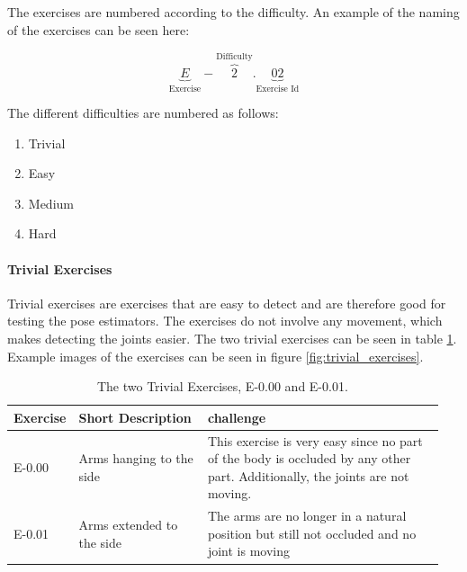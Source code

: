 The exercises are numbered according to the difficulty. An example of the naming of the exercises can be seen here:

\[
    \underbrace{E}_\text{Exercise}-\overbrace{2}^\text{Difficulty}.\underbrace{02}_\text{Exercise Id}
\]

The different difficulties are numbered as follows:

\begin{enumerate}
    \addtocounter{enumi}{-1}
    \item Trivial
    \item Easy
    \item Medium
    \item Hard
\end{enumerate}

\paragraph{Trivial Exercises}

Trivial exercises are exercises that are easy to detect and are therefore good for testing the pose estimators. The exercises do not involve any movement, which makes detecting the joints easier. The two trivial exercises can be seen in table \ref{tab:trivial_exercises}. Example images of the exercises can be seen in figure \ref{fig:trivial_exercises}.

\begin{table}[ht]
  \caption[Trivial Exercises]{The two Trivial Exercises, E-0.00 and E-0.01.}
  \label{tab:trivial_exercises}
  \begin{tabular}{p{0.1\linewidth}p{0.3\linewidth}p{0.55\linewidth}}
  \hline
  Exercise & Short Description         & challenge   \\ \hline
  E-0.00   & Arms hanging to the side  & This exercise is very easy since no part of the body is occluded by any other part. Additionally, the joints are not moving. \\
  E-0.01   & Arms extended to the side & The arms are no longer in a natural position but still not occluded and no joint is moving \\ \hline
  \end{tabular}
\end{table} 

